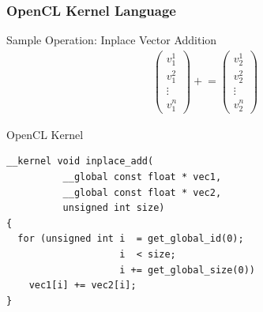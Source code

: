 \begin{frame}[fragile]
\frametitle{OpenCL Kernel Language}

\begin{block}{Sample Operation: Inplace Vector Addition}
 \vspace*{-0.5cm}
 \begin{align*}
  \left(
  \begin{array}{c}
   v_1^1 \\
   v_1^2 \\
   \vdots \\
   v_1^n 
  \end{array} \right) +\!= 
  \left(
  \begin{array}{c}
   v_2^1 \\
   v_2^2 \\
   \vdots \\
   v_2^n 
  \end{array} \right)
 \end{align*}
\end{block}

 \vspace*{-0.3cm}
\begin{block}{OpenCL Kernel}
\begin{lstlisting}
__kernel void inplace_add(
          __global const float * vec1,
          __global const float * vec2,
          unsigned int size) 
{ 
  for (unsigned int i  = get_global_id(0); 
                    i  < size; 
                    i += get_global_size(0))
    vec1[i] += vec2[i];
}
\end{lstlisting}
\end{block}

\end{frame}




